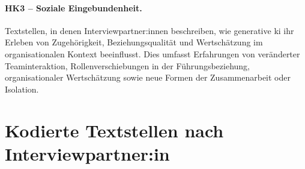\paragraph{HK3 -- Soziale Eingebundenheit.}
Textstellen, in denen Interviewpartner:innen beschreiben, wie generative
\gls{ki} ihr Erleben von Zugehörigkeit, Beziehungsqualität und Wertschätzung
im organisationalen Kontext beeinflusst. Dies umfasst Erfahrungen von
veränderter Teaminteraktion, Rollenverschiebungen in der Führungsbeziehung,
organisationaler Wertschätzung sowie neue Formen der Zusammenarbeit oder
Isolation.

\clearpage
\section*{Kodierte Textstellen nach Interviewpartner:in}

%

% 
% 
%
